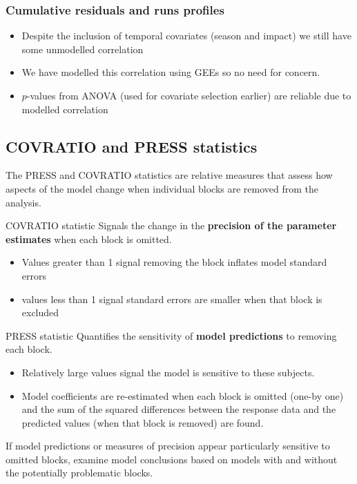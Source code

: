 \begin{frame}
\frametitle{Cumulative residuals and runs profiles}
\begin{itemize}
  \item Despite the inclusion of temporal covariates (season and impact) we still have some unmodelled correlation
  \item We have modelled this correlation using GEEs so no need for concern.
  \item $p$-values from ANOVA (used for covariate selection earlier) are reliable due to modelled correlation
\end{itemize}


\end{frame}

\subsection{COVRATIO and PRESS statistics}
\label{subsec:covpress}

\begin{frame}[fragile]
The PRESS and COVRATIO statistics are relative measures that assess how aspects of the model change when individual blocks are removed from the analysis.

\begin{block}{COVRATIO statistic}
Signals the change in the \textbf{precision of the parameter estimates} when each block is omitted. 
\begin{itemize}
\item Values greater than 1 signal removing the block inflates model standard errors 
\item values less than 1 signal standard errors are smaller when that block is excluded 
\end{itemize}
\end{block}

\begin{block}{PRESS statistic}
Quantifies the sensitivity of \textbf{model predictions} to removing each block. 
\begin{itemize}
\item Relatively large values signal the model is sensitive to these subjects.
\item Model coefficients are re-estimated when each block is omitted (one-by one) and the sum of the squared differences between the response data and the predicted values (when that block is removed) are found.
\end{itemize}
\end{block}

\pause
\bigskip
\noindent If model predictions or measures of precision appear particularly sensitive to omitted blocks, examine model conclusions based on models with and without the potentially problematic blocks.
\end{frame}

